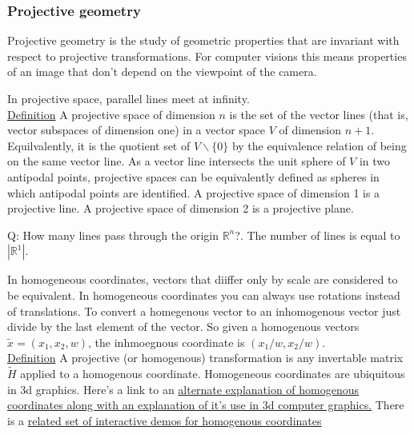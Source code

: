 \documentclass{beamer}
\theoremstyle{definition}
\renewcommand{\=}{&=&}
\newcommand{\<}{\langle}
\renewcommand{\>}{\rangle}
\begin{document}
\begin{frame}[t]
\frametitle{ Projective geometry}
Projective geometry is the study of geometric properties that are invariant
with respect to projective transformations. For computer visions this means
properties
of an image that don't depend on the viewpoint of the camera.

In projective space, parallel lines meet at infinity. \\
\underline{Definition} A projective space of dimension $n$ is the set of the
vector lines (that is, vector subspaces of dimension one) in a vector space $V$
of dimension $n+1$. Equilvalently, it is the quotient set of $V \backslash \{0\}$ by the
equivalence relation of being on the same vector line. As a vector line
intersects the unit sphere of $V$ in two antipodal points, projective spaces can
be equivalently defined as spheres in which antipodal points are identified. A
projective space of dimension 1 is a projective line. A projective space of
dimension 2 is a projective plane. 

Q: How many lines pass through the origin $\mathbb{R}^n$?.
The number of lines is equal to $|\mathbb{R}^1|$.
\end{frame}
\begin{frame}[t]
In homogeneous coordinates, vectors that diiffer only by scale are considered
to be equivalent. In homogeneous coordinates you can always use rotations
instead of translations. To convert a homegenous vector to an inhomogenous
vector just divide by the last element of the vector.  So given a homogenous
vectors $\widetilde{x} = (x_1, x_2, w)$, the inhmoegnous coordinate is $(x_1/w, x_2/w)$.\\
\underline{Definition} A projective (or homogenous) transformation is any
invertable  matrix $\widetilde{H}$ applied to a homogenous coordinate.
Homogeneous coordinates are ubiquitous in 3d graphics. Here's a link to an 
\href{https://hackernoon.com/programmers-guide-to-homogeneous-coordinates-73cbfd2bcc65}{alternate
explanation of homogenous coordinates along with an explanation of it's use in
3d computer graphics.}
 There is a 
\href{http://wordsandbuttons.online/interactive_guide_to_homogeneous_coordinates.html}{related set of interactive demos for homogenous coordinates}

\end{frame}
\end{document}
